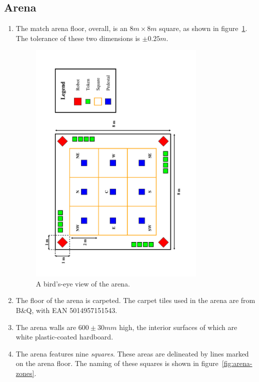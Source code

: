 \subsection{Arena}
\label{sub:arena}
\begin{enumerate}
\item The match arena floor, overall, is an $8m \times 8m$ square, as shown in figure~\ref{fig:arena-dim}.
      The tolerance of these two dimensions is $\pm0.25m$.

\begin{figure}
  \centering
  \includegraphics[width=0.8\textwidth]{./images/arena.pdf}
  \caption{\label{fig:arena-dim}A bird's-eye view of the arena.}
\end{figure}

\item The floor of the arena is carpeted.
      The carpet tiles used in the arena are from B\&Q, with EAN 5014957151543.

\item The arena walls are $600\pm30mm$ high, the interior surfaces of which are white plastic-coated hardboard.

\item The arena features nine \textit{squares}.
      These areas are delineated by lines marked on the arena floor.
      The naming of these squares is shown in figure~\ref{fig:arena-zones}.


\end{enumerate}
